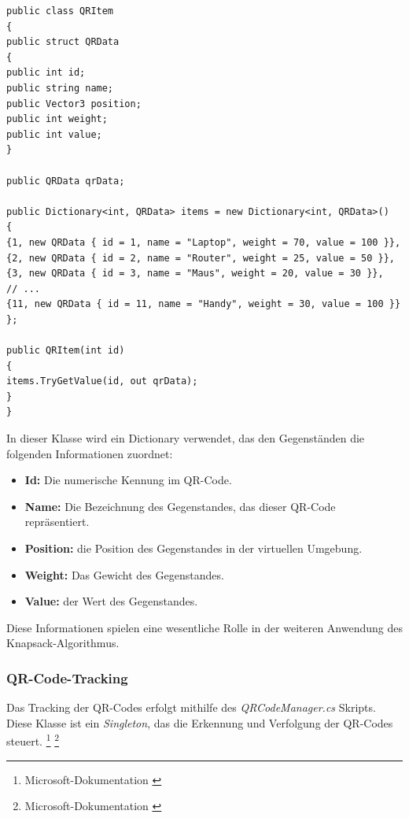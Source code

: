 \begin{lstlisting}[style=csharp, caption={Codeabschnitt von QRItem Klasse}, label=code:update]
public class QRItem
{
public struct QRData
{
public int id;
public string name;
public Vector3 position;
public int weight;
public int value;
}

public QRData qrData;

public Dictionary<int, QRData> items = new Dictionary<int, QRData>()
{
{1, new QRData { id = 1, name = "Laptop", weight = 70, value = 100 }},
{2, new QRData { id = 2, name = "Router", weight = 25, value = 50 }},
{3, new QRData { id = 3, name = "Maus", weight = 20, value = 30 }},
// ...
{11, new QRData { id = 11, name = "Handy", weight = 30, value = 100 }}
};

public QRItem(int id)
{
items.TryGetValue(id, out qrData);
}
}
\end{lstlisting}

In dieser Klasse wird ein Dictionary verwendet, das den Gegenständen die folgenden Informationen zuordnet:

\begin{itemize}
\item \textbf{Id:} Die numerische Kennung im QR-Code.
\item \textbf{Name:} Die Bezeichnung des Gegenstandes, das dieser QR-Code repräsentiert.
\item \textbf{Position:} die Position des Gegenstandes in der virtuellen Umgebung.
\item \textbf{Weight:} Das Gewicht des Gegenstandes.
\item \textbf{Value:} der Wert des Gegenstandes.
\end{itemize}

Diese Informationen spielen eine wesentliche Rolle in der weiteren Anwendung des Knapsack-Algorithmus.

\subsubsection{QR-Code-Tracking}
Das Tracking der QR-Codes erfolgt mithilfe des \textit{QRCodeManager.cs} Skripts. Diese Klasse ist ein \textit{Singleton}, das
die Erkennung und Verfolgung der QR-Codes steuert. \footnote{Microsoft-Dokumentation \cite{Singleton}} \footnote{Microsoft-Dokumentation \cite{QR-Code-Tracking}}

